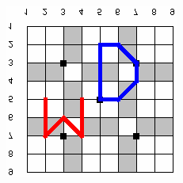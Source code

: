 \begin{anexos}
\begin{figure}[H]
\begin{minipage}{0.4\linewidth}
	\end{minipage} %
	\hfill
	\centering
	\begin{minipage}{0.4\linewidth}  %
		\centering
		\includegraphics[width=\linewidth]{passgo3.png} %
	\end{minipage} %
	\label{go-passwords}
\end{figure} 




\end{anexos}

